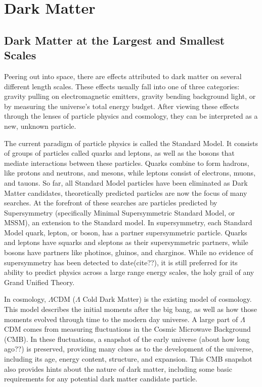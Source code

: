 \cleartooddpage[\thispagestyle{empty}]
\chapter{Dark Matter}

\section{Dark Matter at the Largest and Smallest Scales} %

Peering out into space, there are effects attributed to dark matter on several different length scales.
These effects usually fall into one of three categories: gravity pulling on electromagnetic emitters, gravity bending background light, or by measuring the universe's total energy budget.
After viewing these effects through the lenses of particle physics and cosmology, they can be interpreted as a new, unknown particle.

The current paradigm of particle physics is called the Standard Model.
It consists of groups of particles called quarks and leptons, as well as the bosons that mediate interactions between these particles.
Quarks combine to form hadrons, like protons and neutrons, and mesons, while leptons consist of electrons, muons, and tauons.
So far, all Standard Model particles have been eliminated as Dark Matter candidates, theoretically predicted particles are now the focus of many searches.
At the forefront of these searches are particles predicted by Supersymmetry (specifically Minimal Supersymmetric Standard Model, or MSSM), an extension to the Standard model.
In supersymmetry, each Standard Model quark, lepton, or boson, has a partner supersymmetric particle.
Quarks and leptons have squarks and sleptons as their supersymmetric partners, while bosons have partners like photinos, gluinos, and charginos.
While no evidence of supersymmetry has been detected to date(cite??), it is still preferred for its ability to predict physics across a large range energy scales, the holy grail of any Grand Unified Theory.

In cosmology, $\Lambda$CDM ($\Lambda$ Cold Dark Matter) is the existing model of cosmology.
This model describes the initial moments after the big bang, as well as how those moments evolved through time to the modern day universe.
A large part of $\Lambda$CDM comes from measuring fluctuations in the Cosmic Microwave Background (CMB).
In these fluctuations, a snapshot of the early universe (about how long ago??) is preserved, providing many clues as to the development of the universe, including its age, energy content, structure, and expansion.
This CMB snapshot also provides hints about the nature of dark matter, including some basic requirements for any potential dark matter candidate particle.

